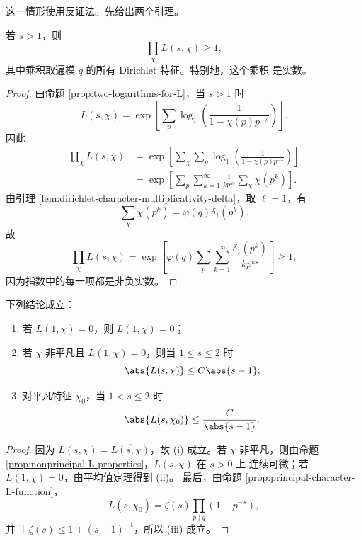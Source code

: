 这一情形使用反证法。先给出两个引理。

\begin{lemma}\label{lem:product-all-dirichlet-L-positive}
	若 $s>1$，则
	\[
	\prod_\chi L(s,\chi)\geq1,
	\]
	其中乘积取遍模 $q$ 的所有 Dirichlet 特征。特别地，这个乘积
	是实数。
\end{lemma}

\begin{proof}
	由命题 \ref{prop:two-logarithms-for-L}，当 $s>1$ 时
	\[
	L(s,\chi)
	=\exp\left[
	\sum_p\log_1\left(
	\frac1{1-\chi(p)p^{-s}}
	\right)
	\right].
	\]
	因此
	\[
	\begin{aligned}
	\prod_\chi L(s,\chi)
	&=\exp\left[
	\sum_\chi\sum_p
	\log_1\left(
	\frac1{1-\chi(p)p^{-s}}
	\right)
	\right]\\
	&=\exp\left[
	\sum_p\sum_{k=1}^{\infty}
	\frac1{k p^{ks}}
	\sum_\chi\chi(p^k)
	\right].
	\end{aligned}
	\]
	由引理 \ref{lem:dirichlet-character-multiplicativity-delta}，取
$\ell=1$，有
	\[
	\sum_\chi\chi(p^k)=\varphi(q)\delta_1(p^k).
	\]
	故
	\[
	\prod_\chi L(s,\chi)
	=\exp\left[
	\varphi(q)\sum_p\sum_{k=1}^{\infty}
	\frac{\delta_1(p^k)}{k p^{ks}}
	\right]\geq1,
	\]
	因为指数中的每一项都是非负实数。
\end{proof}

\begin{lemma}\label{lem:L-conjugation-and-near-one-bounds}
	下列结论成立：
	\begin{enumerate}[label=\textup{(\roman*)}]
		\item 若 $L(1,\chi)=0$，则 $L(1,\overline\chi)=0$；
		\item 若 $\chi$ 非平凡且 $L(1,\chi)=0$，则当
		$1\leq s\leq2$ 时
		\[
		\abs{L(s,\chi)}\leq C\abs{s-1};
		\]
		\item 对平凡特征 $\chi_0$，当 $1<s\leq2$ 时
		\[
		\abs{L(s,\chi_0)}\leq\frac{C}{\abs{s-1}}.
		\]
	\end{enumerate}
\end{lemma}

\begin{proof}
	因为 $L(s,\overline\chi)=\overline{L(s,\chi)}$，故
\textup{(i)} 成立。若 $\chi$ 非平凡，则由命题
\ref{prop:nonprincipal-L-properties}，$L(s,\chi)$ 在 $s>0$ 上
连续可微；若 $L(1,\chi)=0$，由平均值定理得到 \textup{(ii)}。
最后，由命题 \ref{prop:principal-character-L-function}，
	\[
	L(s,\chi_0)=\zeta(s)\prod_{p\mid q}(1-p^{-s}),
	\]
	并且 $\zeta(s)\leq1+(s-1)^{-1}$，所以 \textup{(iii)} 成立。
\end{proof}

